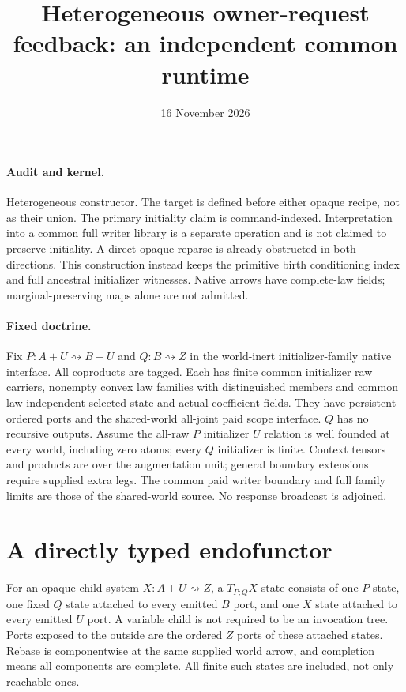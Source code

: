 \documentclass[11pt]{article}
\title{Heterogeneous owner-request feedback: an independent common runtime}
\date{16 November 2026}
\begin{document}
\maketitle
\paragraph{Audit and kernel.} Heterogeneous constructor. The target is defined before either opaque recipe, not as their union. The primary initiality claim is command-indexed. Interpretation into a common full writer library is a separate operation and is not claimed to preserve initiality. A direct opaque reparse is already obstructed in both directions. This construction instead keeps the primitive birth conditioning index and full ancestral initializer witnesses. Native arrows have complete-law fields; marginal-preserving maps alone are not admitted.

\paragraph{Fixed doctrine.} Fix $P:A+U\rightsquigarrow B+U$ and $Q:B\rightsquigarrow Z$ in the world-inert initializer-family native interface. All coproducts are tagged. Each has finite common initializer raw carriers, nonempty convex law families with distinguished members and common law-independent selected-state and actual coefficient fields. They have persistent ordered ports and the shared-world all-joint paid scope interface. $Q$ has no recursive outputs. Assume the all-raw $P$ initializer $U$ relation is well founded at every world, including zero atoms; every $Q$ initializer is finite. Context tensors and products are over the augmentation unit; general boundary extensions require supplied extra legs. The common paid writer boundary and full family limits are those of the shared-world source. No response broadcast is adjoined.

\section{A directly typed endofunctor}
For an opaque child system $X:A+U\rightsquigarrow Z$, a $T_{P;Q}X$ state consists of one $P$ state, one fixed $Q$ state attached to every emitted $B$ port, and one $X$ state attached to every emitted $U$ port. A variable child is not required to be an invocation tree. Ports exposed to the outside are the ordered $Z$ ports of these attached states. Rebase is componentwise at the same supplied world arrow, and completion means all components are complete. All finite such states are included, not only reachable ones.
\end{document}
